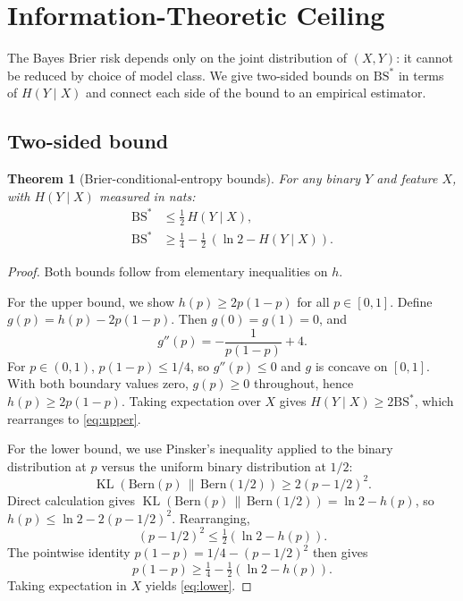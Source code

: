 \documentclass[11pt,a4paper]{article}
\newtheorem{theorem}{Theorem}
\theoremstyle{definition}
\DeclareMathOperator{\KL}{KL}
\newcommand{\BS}{\mathrm{BS}}
\begin{document}
\section{Information-Theoretic Ceiling}\label{sec:ceiling}

The Bayes Brier risk depends only on the joint distribution of $(X, Y)$: it cannot be reduced by choice of model class. We give two-sided bounds on $\BS^*$ in terms of $H(Y \mid X)$ and connect each side of the bound to an empirical estimator.

\subsection{Two-sided bound}

\begin{theorem}[Brier-conditional-entropy bounds]\label{thm:bs-entropy}
For any binary $Y$ and feature $X$, with $H(Y \mid X)$ measured in nats:
\begin{align}
\BS^* &\le \tfrac{1}{2}\, H(Y \mid X), \tag{Upper bound}\label{eq:upper}\\
\BS^* &\ge \tfrac{1}{4} - \tfrac{1}{2}\,(\ln 2 - H(Y \mid X)).\tag{Lower bound}\label{eq:lower}
\end{align}
\end{theorem}

\begin{proof}
Both bounds follow from elementary inequalities on $h$.

For the upper bound, we show $h(p) \ge 2 p(1-p)$ for all $p \in [0,1]$. Define $g(p) = h(p) - 2p(1-p)$. Then $g(0) = g(1) = 0$, and
\[
g''(p) = -\frac{1}{p(1-p)} + 4.
\]
For $p \in (0,1)$, $p(1-p) \le 1/4$, so $g''(p) \le 0$ and $g$ is concave on $[0,1]$. With both boundary values zero, $g(p) \ge 0$ throughout, hence $h(p) \ge 2p(1-p)$. Taking expectation over $X$ gives $H(Y \mid X) \ge 2 \BS^*$, which rearranges to \eqref{eq:upper}.

For the lower bound, we use Pinsker's inequality applied to the binary distribution at $p$ versus the uniform binary distribution at $1/2$:
\[
\KL(\mathrm{Bern}(p) \,\|\, \mathrm{Bern}(1/2)) \ge 2 (p - 1/2)^2.
\]
Direct calculation gives $\KL(\mathrm{Bern}(p) \,\|\, \mathrm{Bern}(1/2)) = \ln 2 - h(p)$, so $h(p) \le \ln 2 - 2(p - 1/2)^2$. Rearranging,
\[
(p - 1/2)^2 \le \tfrac{1}{2}(\ln 2 - h(p)).
\]
The pointwise identity $p(1-p) = 1/4 - (p - 1/2)^2$ then gives
\[
p(1-p) \ge \tfrac{1}{4} - \tfrac{1}{2}(\ln 2 - h(p)).
\]
Taking expectation in $X$ yields \eqref{eq:lower}.
\end{proof}
\end{document}
